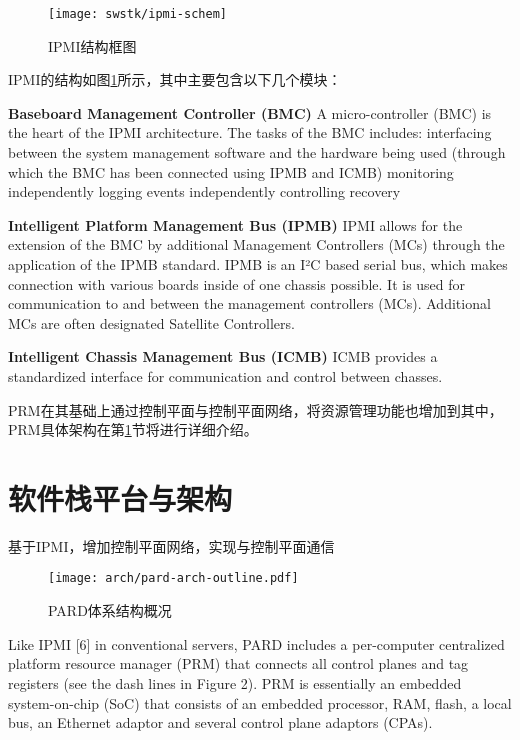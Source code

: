 \begin{figure}[tbh]
  \centering
  \texttt{[image: swstk/ipmi-schem]}
  \caption{IPMI结构框图}
  \label{fig:ipmi-schem}
\end{figure}

IPMI的结构如图\ref{fig:ipmi-schem}所示，其中主要包含以下几个模块：

\textbf{Baseboard Management Controller (BMC)}\quad
A micro-controller (BMC) is the heart of the IPMI architecture. The tasks of the BMC includes:
interfacing between the system management software and the hardware being used (through which the BMC has been connected using IPMB and ICMB)
monitoring independently
logging events independently
controlling recovery

\textbf{Intelligent Platform Management Bus (IPMB)}\quad
IPMI allows for the extension of the BMC by additional Management Controllers (MCs) through the application of the IPMB standard.
IPMB is an I²C based serial bus, which makes connection with various boards inside of one chassis possible. It is used for communication to and between the management controllers (MCs). Additional MCs are often designated Satellite Controllers.

\textbf{Intelligent Chassis Management Bus (ICMB)}\quad
ICMB provides a standardized interface for communication and control between chasses.

PRM在其基础上通过控制平面与控制平面网络，将资源管理功能也增加到其中，PRM具体架构在第\ref{chap:prm:arch}节将进行详细介绍。


\section{软件栈平台与架构}
\label{chap:prm:arch}

基于IPMI，增加控制平面网络，实现与控制平面通信

\begin{figure}[tbh]
  \centering
  \texttt{[image: arch/pard-arch-outline.pdf]}
  \caption[PARD体系结构概况]{PARD体系结构概况}
  \label{fig:pard-arch-outline}
\end{figure}


Like IPMI [6] in conventional servers, PARD includes a
per-computer centralized platform resource manager (PRM) that
connects all control planes and tag registers (see the dash lines in
Figure 2). PRM is essentially an embedded system-on-chip (SoC)
that consists of an embedded processor, RAM, flash, a local bus, an
Ethernet adaptor and several control plane adaptors (CPAs).

